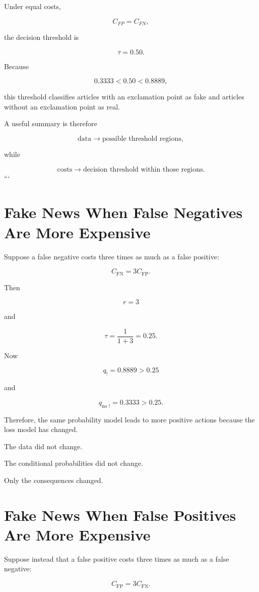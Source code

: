 \documentclass[11pt]{article}
\newcommand{\CFP}{C_{\mathrm{FP}}}
\newcommand{\CFN}{C_{\mathrm{FN}}}
\begin{document}
Under equal costs,

\[
C_{FP}=C_{FN},
\]

the decision threshold is

\[
\boxed{\tau=0.50}.
\]

Because

\[
0.3333<0.50<0.8889,
\]

this threshold classifies articles with an exclamation point as fake and
articles without an exclamation point as real.

A useful summary is therefore

\[
\boxed{
\text{data}
\longrightarrow
\text{possible threshold regions},
}
\]

while

\[
\boxed{
\text{costs}
\longrightarrow
\text{decision threshold within those regions}.
}
\]
```


\section{Fake News When False Negatives Are More Expensive}

Suppose a false negative costs three times as much as a false positive:

\[
\CFN=3\CFP.
\]

Then

\[
r=3
\]

and

\[
\tau
=
\frac{1}{1+3}
=
0.25.
\]

Now

\[
q_{!}=0.8889>0.25
\]

and

\[
q_{\text{no }!}=0.3333>0.25.
\]

Therefore, the same probability model leads to more positive actions because the loss model has changed.

The data did not change.

The conditional probabilities did not change.

Only the consequences changed.

\section{Fake News When False Positives Are More Expensive}

Suppose instead that a false positive costs three times as much as a false negative:

\[
\CFP=3\CFN.
\]
\end{document}
